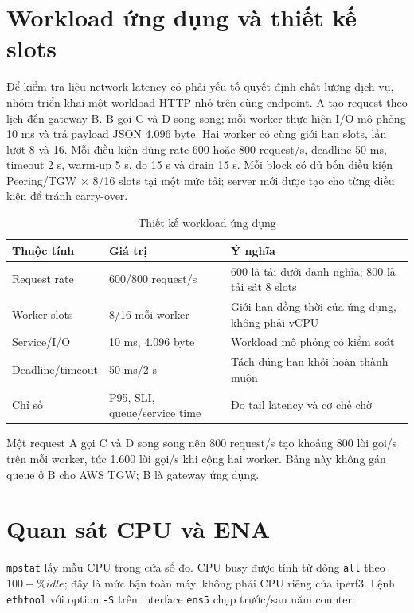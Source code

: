 \section{Workload ứng dụng và thiết kế slots}

Để kiểm tra liệu network latency có phải yếu tố quyết định chất lượng dịch vụ,
nhóm triển khai một workload HTTP nhỏ trên cùng endpoint. A tạo request theo
lịch đến gateway B. B gọi C và D song song; mỗi worker thực hiện I/O mô phỏng
10 ms và trả payload JSON 4.096 byte. Hai worker có cùng giới hạn slots, lần
lượt 8 và 16. Mỗi điều kiện dùng rate 600 hoặc 800 request/s, deadline 50 ms,
timeout 2 s, warm-up 5 s, đo 15 s và drain 15 s. Mỗi block có đủ bốn điều kiện
Peering/TGW $\times$ 8/16 slots tại một mức tải; server mới được tạo cho từng
điều kiện để tránh carry-over.

\begin{table}[H]
\centering
\caption{Thiết kế workload ứng dụng}
\label{tab:application-conditions}
\begin{tabularx}{\textwidth}{p{}XX}
\toprule
\textbf{Thuộc tính} & \textbf{Giá trị} & \textbf{Ý nghĩa} \\
\midrule
Request rate & 600/800 request/s & 600 là tải dưới danh nghĩa; 800 là tải sát 8 slots \\
Worker slots & 8/16 mỗi worker & Giới hạn đồng thời của ứng dụng, không phải vCPU \\
Service/I/O & 10 ms, 4.096 byte & Workload mô phỏng có kiểm soát \\
Deadline/timeout & 50 ms/2 s & Tách đúng hạn khỏi hoàn thành muộn \\
Chỉ số & P95, SLI, queue/service time & Đo tail latency và cơ chế chờ \\
\bottomrule
\end{tabularx}
\end{table}

Một request A gọi C và D song song nên 800 request/s tạo khoảng 800 lời gọi/s
trên mỗi worker, tức 1.600 lời gọi/s khi cộng hai worker. Bảng này không gán
queue ở B cho AWS TGW; B là gateway ứng dụng.

\section{Quan sát CPU và ENA}

\texttt{mpstat} lấy mẫu CPU trong cửa sổ đo. CPU busy được tính từ dòng
\texttt{all} theo $100-\%idle$; đây là mức bận toàn máy, không phải CPU riêng
của iperf3. Lệnh \texttt{ethtool} với option \texttt{-S} trên interface
\texttt{ens5} chụp trước/sau năm counter:

